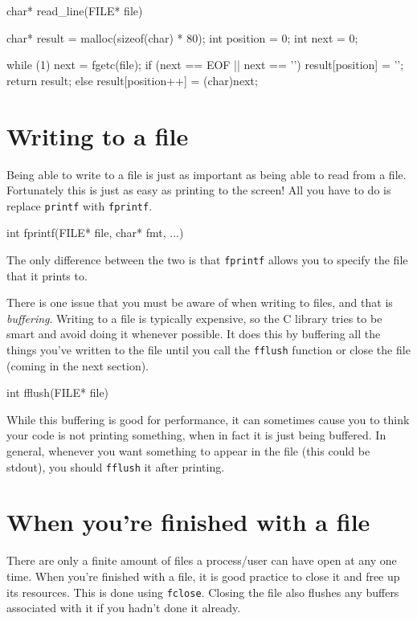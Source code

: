 \begin{codeblock}
char* read_line(FILE* file)
{
    char* result = malloc(sizeof(char) * 80);
    int position = 0;
    int next = 0;

    while (1) {
        next = fgetc(file);
        if (next == EOF || next == '\n') {
            result[position] = '\0';
            return result;
        } else {
            result[position++] = (char)next;
        }
    }
}
\end{codeblock}

\section{Writing to a file}

Being able to write to a file is just as important as being able to read from a file.
Fortunately this is just as easy as printing to the screen!
All you have to do is replace \texttt{printf} with \texttt{fprintf}.

\begin{codeinline}
int fprintf(FILE* file, char* fmt, ...)
\end{codeinline}

The only difference between the two is that \texttt{fprintf} allows you to specify the file that it prints to.

There is one issue that you must be aware of when writing to files, and that is \emph{buffering}. 
Writing to a file is typically expensive, so the C library tries to be smart and avoid doing it whenever possible.
It does this by buffering all the things you've written to the file until you call the \texttt{fflush} function or close the file (coming in the next section).

\begin{codeinline}
int fflush(FILE* file)
\end{codeinline}

While this buffering is good for performance, it can sometimes cause you to think your code is not printing something, when in fact it is just being buffered.
In general, whenever you want something to appear in the file (this could be stdout), you should \texttt{fflush} it after printing.

\section{When you're finished with a file}

There are only a finite amount of files a process/user can have open at any one time.
When you're finished with a file, it is good practice to close it and free up its resources.
This is done using \texttt{fclose}.
Closing the file also flushes any buffers associated with it if you hadn't done it already.

